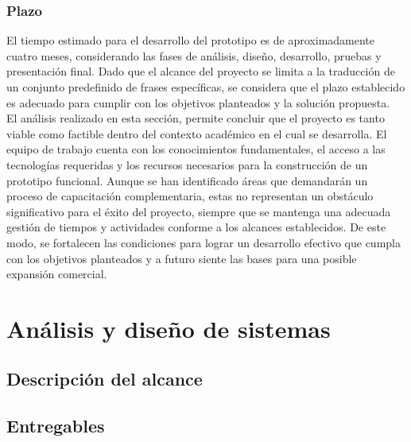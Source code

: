 \subsubsection{Plazo}
El tiempo estimado para el desarrollo del prototipo es de aproximadamente cuatro meses, considerando las fases de análisis, diseño, desarrollo, pruebas y presentación final. Dado que el alcance del proyecto se limita a la traducción de un conjunto predefinido de frases específicas, se considera que el plazo establecido es adecuado para cumplir con los objetivos planteados y la solución propuesta. \\


El análisis realizado en esta sección, permite concluir que el proyecto es tanto viable como factible dentro del contexto académico en el cual se desarrolla. El equipo de trabajo cuenta con los conocimientos fundamentales, el acceso a las tecnologías requeridas y los recursos necesarios para la construcción de un prototipo funcional. Aunque se han identificado áreas que demandarán un proceso de capacitación complementaria, estas no representan un obstáculo significativo para el éxito del proyecto, siempre que se mantenga una adecuada gestión de tiempos y actividades conforme a los alcances establecidos. De este modo, se fortalecen las condiciones para lograr un desarrollo efectivo que cumpla con los objetivos planteados y a futuro siente las bases para una posible expansión comercial.

\section{Análisis y diseño de sistemas}
\subsection{Descripción del alcance}
\subsection{Entregables}
